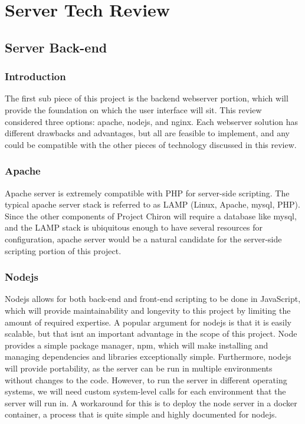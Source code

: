 \documentclass[onecolumn, draftclsnofoot,10pt, compsoc]{report}
\begin{document}
\chapter{Server Tech Review}
\minitoc
\section{Server Back-end}
\subsection{Introduction}
The first sub piece of this project is the backend webserver portion, which will provide the foundation on which the user
interface will sit. This review considered three options: apache, nodejs, and nginx. Each webserver solution has different drawbacks and advantages, but all are feasible to implement, and any could be compatible with the other pieces of technology discussed in this review.
\subsection{Apache}
Apache server is extremely compatible with PHP for server-side scripting. The typical apache server stack is referred to
as LAMP (Linux, Apache, mysql, PHP). Since the other components of Project Chiron will require a database like mysql,
and the LAMP stack is ubiquitous enough to have several resources for configuration, apache server would be a natural
candidate for the server-side scripting portion of this project.
\subsection{Nodejs}
Nodejs allows for both back-end and front-end scripting to be done in JavaScript, which will provide maintainability
and longevity to this project by limiting the amount of required expertise. A popular argument for nodejs is that it
is easily scalable, but that isnt an important advantage in the scope of this project. Node provides a simple package
manager, npm, which will make installing and managing dependencies and libraries exceptionally simple. Furthermore,
nodejs will provide portability, as the server can be run in multiple environments without changes to the code. However,
to run the server in different operating systems, we will need custom system-level calls for each environment that the
server will run in. A workaround for this is to deploy the node server in a docker container, a process that is quite
simple and highly documented for nodejs.
\end{document}
